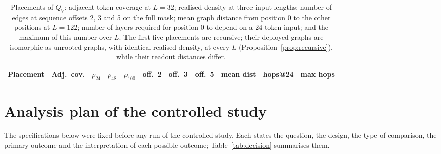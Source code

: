 \documentclass[10pt]{article}
\begin{document}
\begin{table}[H]
\centering
\caption{Placements of $Q_7$: adjacent-token coverage at $L=32$; realised density at three input lengths; number of edges at sequence offsets 2, 3 and 5 on the full mask; mean graph distance from position 0 to the other positions at $L=122$; number of layers required for position 0 to depend on a 24-token input; and the maximum of this number over $L$. The first five placements are recursive; their deployed graphs are isomorphic as unrooted graphs, with identical realised density, at every $L$ (Proposition~\ref{prop:recursive}), while their readout distances differ.}
\label{tab:placements}
\scriptsize
\begin{tabular}{lcccccccccc}
\toprule
Placement & Adj.\ cov. & $\rho_{24}$ & $\rho_{48}$ & $\rho_{100}$ & off.\ 2 & off.\ 3 & off.\ 5 & mean dist & hops@24 & max hops \\
\midrule

\end{tabular}
\end{table}

\section{Analysis plan of the controlled study}
\label{app:plan}

The specifications below were fixed before any run of the controlled study. Each states the question, the design, the type of comparison, the primary outcome and the interpretation of each possible outcome; Table~\ref{tab:decision} summarises them.
\end{document}
